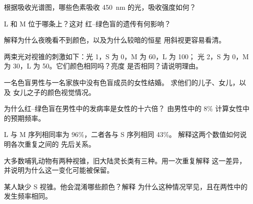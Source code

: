 \begin{exercise}[$\star$]\label{exo:g11:the-eye:4}
根据吸收光谱图，哪些色素吸收
\qty{450}{nm} 的光，吸收强度如何？
\end{exercise}

\begin{exercise}[$\star$]\label{exo:g11:the-eye:5}
L 和 M 位于哪条上？这对
红–绿色盲的遗传有何影响？
\end{exercise}

\begin{exercise}[$\star\star$]\label{exo:g11:the-eye:6}
解释为什么夜晚看不到颜色，以及为什么较暗的恒星
用斜视更容易看清。
\end{exercise}

\begin{exercise}[$\star\star$]\label{exo:g11:the-eye:7}
两束光对视锥的刺激如下：光 1，S 为 0，M 为 60，L 为 100；
光 2，S 为 0，M 为 30，L 为 50。它们颜色相同吗？亮度
是否相同？请说明理由。
\end{exercise}

\begin{exercise}[$\star\star$]\label{exo:g11:the-eye:8}
一名色盲男性与一名家族中没有色盲成员的女性结婚。
求他们的儿子、女儿，以及
女儿之子的颜色视觉情况。
\end{exercise}

\begin{exercise}[$\star\star$]\label{exo:g11:the-eye:9}
为什么红–绿色盲在男性中的发病率是女性的十六倍？
由男性中的 8\% 计算女性中的预期频率。
\end{exercise}

\begin{exercise}[$\star\star$]\label{exo:g11:the-eye:10}
L 与 M 序列相同率为 96\%，二者各与 S 序列相同 43\%。
解释这两个数值如何说明各次重复之间的
先后关系。
\end{exercise}

\begin{exercise}[$\star\star$]\label{exo:g11:the-eye:11}
大多数哺乳动物有两种视锥，旧大陆灵长类有三种。用一次重复解释
这一差异，并说明为什么这一变化可能被保留。
\end{exercise}

\begin{exercise}[$\star\star\star$]\label{exo:g11:the-eye:12}
某人缺少 S 视锥。他会混淆哪些颜色？解释
为什么这种情况罕见，且在两性中的发生频率相同。
\end{exercise}


